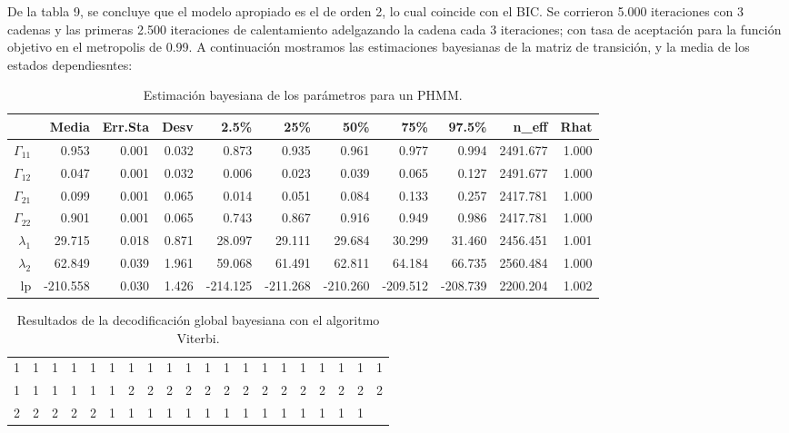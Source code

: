 \documentclass[a4paper]{article}\usepackage[]{graphicx}\usepackage[]{color}
\begin{document}
De la tabla 9, se concluye que el modelo apropiado es el de orden 2, lo cual coincide con el BIC. Se corrieron 5.000 iteraciones con 3 cadenas y las primeras 2.500 iteraciones de calentamiento adelgazando la cadena cada 3 iteraciones; con tasa de aceptación para la función objetivo en el metropolis de 0.99. A continuación mostramos las estimaciones bayesianas de la matriz de transición, y la media de los estados dependiesntes:

\begin{table}[ht]
\centering
\begin{tabular}{rrrrrrrrrrr}
  \hline
 & Media & Err.Sta & Desv & 2.5\% & 25\% & 50\% & 75\% & 97.5\% & n\_eff & Rhat \\ 
  \hline
$\Gamma_{11}$ & 0.953 & 0.001 & 0.032 & 0.873 & 0.935 & 0.961 & 0.977 & 0.994 & 2491.677 & 1.000 \\ 
  $\Gamma_{12}$ & 0.047 & 0.001 & 0.032 & 0.006 & 0.023 & 0.039 & 0.065 & 0.127 & 2491.677 & 1.000 \\ 
  $\Gamma_{21}$ & 0.099 & 0.001 & 0.065 & 0.014 & 0.051 & 0.084 & 0.133 & 0.257 & 2417.781 & 1.000 \\ 
  $\Gamma_{22}$ & 0.901 & 0.001 & 0.065 & 0.743 & 0.867 & 0.916 & 0.949 & 0.986 & 2417.781 & 1.000 \\ 
  $\lambda_1$ & 29.715 & 0.018 & 0.871 & 28.097 & 29.111 & 29.684 & 30.299 & 31.460 & 2456.451 & 1.001 \\ 
  $\lambda_2$ & 62.849 & 0.039 & 1.961 & 59.068 & 61.491 & 62.811 & 64.184 & 66.735 & 2560.484 & 1.000 \\ 
  lp & -210.558 & 0.030 & 1.426 & -214.125 & -211.268 & -210.260 & -209.512 & -208.739 & 2200.204 & 1.002 \\ 
   \hline
\end{tabular}
\caption{Estimación bayesiana de los parámetros para un PHMM.} 
\end{table}


\begin{table}[ht]
\centering
\begin{tabular}{rrrrrrrrrrrrrrrrrrrr}
  \hline
  \hline
1 & 1 & 1 & 1 & 1 & 1 & 1 & 1 & 1 & 1 & 1 & 1 & 1 & 1 & 1 & 1 & 1 & 1 & 1 & 1 \\ 
  1 & 1 & 1 & 1 & 1 & 1 & 2 & 2 & 2 & 2 & 2 & 2 & 2 & 2 & 2 & 2 & 2 & 2 & 2 & 2 \\ 
  2 & 2 & 2 & 2 & 2 & 1 & 1 & 1 & 1 & 1 & 1 & 1 & 1 & 1 & 1 & 1 & 1 & 1 & 1 &  \\ 
   \hline
\end{tabular}
\caption{Resultados de la decodificación global bayesiana con el algoritmo Viterbi.} 
\end{table}
\end{document}
